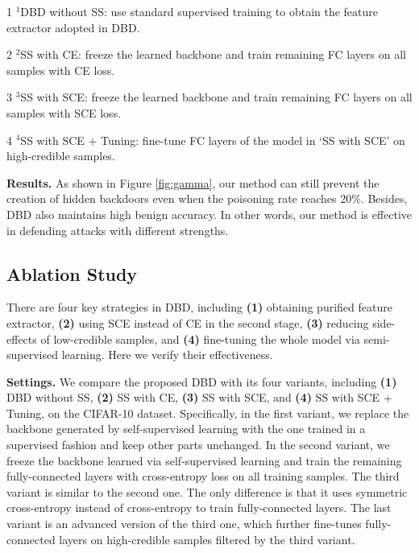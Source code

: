 \begin{table*}[!t]
{\begin{tabular}{c|cccc|cc|cc}
         \\ \bottomrule
      \end{tabular}
   }
   \begin{tablenotes}
      \footnotesize
      \item[1] $^{1}$DBD without SS: use standard supervised training to obtain the feature extractor adopted in DBD.
      \item[2] $^{2}$SS with CE: freeze the learned backbone and train remaining FC layers on all samples with CE loss.
      \item[3] $^{3}$SS with SCE: freeze the learned backbone and train remaining FC layers on all samples with SCE loss.
      \item[4] $^{4}$SS with SCE + Tuning: fine-tune FC layers of the model in `SS with SCE' on high-credible samples.
   \end{tablenotes}
   \label{tab:ablation}
   \vspace{-1em}
\end{table*}

\noindent \textbf{Results. }
As shown in Figure \ref{fig:gamma}, our method can still prevent the creation of hidden backdoors even when the poisoning rate reaches 20\%. Besides, DBD also maintains high benign accuracy. In other words, our method is effective in defending attacks with different strengths. %

\subsection{Ablation Study}
\label{sec:ablation_study}

There are four key strategies in DBD, including \textbf{(1)} obtaining purified feature extractor, \textbf{(2)} using SCE instead of CE in the second stage, \textbf{(3)} reducing side-effects of low-credible samples, and \textbf{(4)} fine-tuning the whole model via semi-supervised learning. Here we verify their effectiveness.

\noindent \textbf{Settings. }
We compare the proposed DBD with its four variants, including \textbf{(1)} DBD without SS, \textbf{(2)} SS with CE, \textbf{(3)} SS with SCE, and \textbf{(4)} SS with SCE + Tuning, on the CIFAR-10 dataset. Specifically, in the first variant, we replace the backbone generated by self-supervised learning with the one trained in a supervised fashion and keep other parts unchanged. In the second variant, we freeze the backbone learned via self-supervised learning and train the remaining fully-connected layers with cross-entropy loss on all training samples. The third variant is similar to the second one. The only difference is that it uses symmetric cross-entropy instead of cross-entropy to train fully-connected layers. The last variant is an advanced version of the third one, which further fine-tunes fully-connected layers on high-credible samples filtered by the third variant. %

